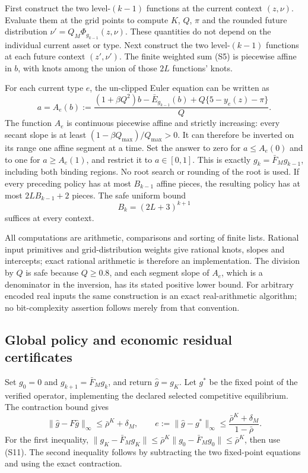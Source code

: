 \documentclass[11pt,a4paper]{article}
\begin{document}
First construct the two level-$(k-1)$ functions at the current context
$(z,\nu)$. Evaluate them at the grid points to compute $K$, $Q$, $\pi$
and the rounded future distribution
$\nu'=Q_M\Phi_{g_{k-1}}(z,\nu)$. These quantities do not depend on the
individual current asset or type. Next construct the two
level-$(k-1)$ functions at each future context $(z',\nu')$.
The finite weighted sum \textup{(S5)} is piecewise affine in $b$,
with knots among the union of those $2L$ functions' knots.

For each current type $e$, the un-clipped Euler equation can be
written as
\[
 a=A_e(b):=
 \frac{(1+\beta Q^2)b-\bar E_{g_{k-1}}(b)
       +Q\{5-y_e(z)-\pi\}}{Q}.
 \tag{S11a}
\]
The function $A_e$ is continuous piecewise affine and strictly
increasing: every secant slope is at least
$(1-\beta Q_{\max})/Q_{\max}>0$. It can therefore be inverted on
its range one affine segment at a time. Set the answer to zero for
$a\leq A_e(0)$ and to one for $a\geq A_e(1)$, and restrict it to
$a\in[0,1]$. This is exactly $g_k=\bar F_Mg_{k-1}$, including both
binding regions. No root search or rounding of the root is used.
If every preceding policy has at most $B_{k-1}$ affine pieces,
the resulting policy has at most $2L B_{k-1}+2$ pieces. The safe
uniform bound
\[
 B_k=(2L+3)^{k+1}
 \tag{S11b}
\]
suffices at every context.

All computations are arithmetic, comparisons and sorting of finite
lists. Rational input primitives and grid-distribution weights give
rational knots, slopes and intercepts; exact rational arithmetic is
therefore an implementation. The division by $Q$ is safe because
$Q\geq0.8$, and each segment slope of $A_e$, which is a denominator
in the inversion, has its stated positive lower bound. For arbitrary
encoded real inputs the same construction is an
exact real-arithmetic algorithm; no bit-complexity assertion follows
merely from that convention.

\subsection{Global policy and economic residual certificates}
Set $g_0=0$ and $g_{k+1}=\bar F_Mg_k$, and return $\hat g=g_K$.
Let $g^*$ be the fixed point of the verified operator, implementing
the declared selected competitive equilibrium. The contraction bound
gives
\[
 \|\hat g-F\hat g\|_\infty\leq \bar\rho^K+\delta_M,\qquad
 e:=\|\hat g-g^*\|_\infty
 \leq\frac{\bar\rho^K+\delta_M}{1-\bar\rho}.
 \tag{S12}
\]
For the first inequality,
$\|g_K-\bar F_Mg_K\|\leq
\bar\rho^K\|g_0-\bar F_Mg_0\|\leq \bar\rho^K$, then use
\textup{(S11)}. The second inequality follows by subtracting the two
fixed-point equations and using the exact contraction.
\end{document}
